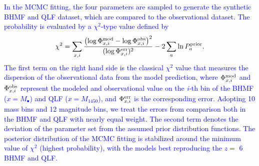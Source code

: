 \documentclass[twocolumn, twocolappendix]{aastex63}
\newcommand{\Mbh}{M_\bullet}
\newcommand{\Muv}{M_{1450}}
\newcommand{\blue}[1]{\textcolor{blue}{ #1}}
\begin{document}
\begin{CJK*}{UTF8}{gbsn}
\blue{
In the MCMC fitting, the four parameters are sampled to generate the synthetic BHMF and QLF dataset,
which are compared to the observational dataset. 
The probability is evaluated by a $\chi^2$-type value defined by
%
\begin{align}
  \chi^2 = \sum_{x,i}
  \frac{\left(\log{\Phi^{\rm mod}_{x,i}} - \log{\Phi^{\rm obs}_{x,i}}\right)^2}{(\log{\Phi^{\rm err}_{x,i}})^2}
  - 2 \sum_{a} \ln P^{\rm prior}_a.
\end{align}
%
The first term on the right hand side is the classical $\chi^2$ value that measures the dispersion of the observational data from the model prediction,
where $\Phi^{\rm mod}_{x,i}$ and $\Phi^{\rm obs}_{x,i}$ represent the modeled and observational value 
on the \textit{i-}th bin of the BHMF ($x=\Mbh$) and QLF ($x=\Muv$), and $\Phi^{\rm err}_{x,i}$ is the corresponding error.
Adopting 10 mass bins and 12 magnitude bins, we treat the errors from comparison both in the BHMF and QLF
with nearly equal weight.
The second term denotes the deviation of the parameter set from the assumed prior distribution functions.
The posterior distribution of the MCMC fitting is stabilized around the minimum value of $\chi^2$ (highest probability), 
with the models best reproducing the $z=$ 6 BHMF and QLF.
}



\vspace{2mm}

\end{CJK*}
\end{document}
